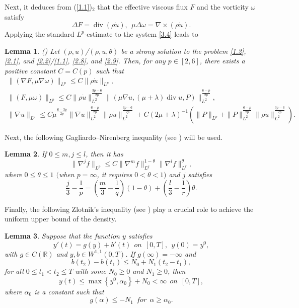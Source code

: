 \documentclass[11pt]{article}
\newtheorem{Lemma}{Lemma}[section]
\DeclareMathOperator{\divv}{div}
\begin{document}
Next, it deduces from (\ref{1.1})$_2$ that the effective viscous flux $F$ and the vorticity $\omega$ satisfy
\begin{equation}\label{3.4}
\Delta F = \divv (\rho \dot u),\ \  \mu \Delta \omega = \nabla \times(\rho \dot u).
\end{equation}
Applying the standard $L^p$-estimate to the system \eqref{3.4} leads to
\begin{Lemma}\label{lem3.3}(\cite{HLX2012})
Let $(\rho, u)$/$(\rho, u, \theta )$ be a strong solution to the problem \eqref{1.2}, \eqref{2.1}, and \eqref{2.2}/\eqref{1.1}, \eqref{2.8}, and \eqref{2.9}. Then, for any $p \in [2,6]$, there exists a positive constant $C=C(p)$ such that
\begin{gather}\label{3.5}
\|(\nabla F,\mu \nabla \omega )\|_{L^p} \leq C \|\rho \dot u\|_{L^p},
\\ \label{3.6}
\|(F, \mu \omega )\|_{L^p} \leq C \|\rho \dot u\|_{L^2}^{\frac{3p - 6}{2p}} \|(\mu \nabla u, (\mu + \lambda ) \divv u, P)\|_{L^2}^{\frac{6 - p}{2p}},
\\ \label{3.7}
\|\nabla u\|_{L^p}
\leq C \mu^{\frac{6 - 3p}{2p}} \|\nabla u\|_{L^2}^{\frac{6 - p}{2p}} \|\rho \dot{u}\|_{L^2}^{\frac{3 p -6}{2p}} + C \left( 2 \mu + \lambda \right)^{-1} \left( \|P\|_{L^p} + \|P\|_{L^2}^{\frac{6 - p}{2p}} \|\rho \dot{u}\|_{L^2}^{\frac{3 p -6}{2p}} \right).
\end{gather}
\end{Lemma}

Next, the following Gagliardo--Nirenberg inequality (see \cite[Theorem 12.87]{book17}) will be used.
\begin{Lemma}\label{lem3.4}
 If $0\leq m,j\leq l$, then it has
$$
\|\nabla^{j}f\|_{L^p} \leq C\|\nabla^m f\|_{L^q}^{1-\theta} \|\nabla^l f\|_{L^r}^\theta,
$$
where $0\leq \theta\leq 1$ $($when $p=\infty$, it requires $0<\theta<1)$   and $j$ satisfies
$$
\frac{j}{3} - \frac{1}{p} = \left( \frac{m}{3} - \frac{1}{q} \right) (1-\theta) + \left(\frac{l}{3} - \frac{1}{r} \right) \theta.
$$
\end{Lemma}


Finally, the following Zlotnik's inequality (see \cite[Lemma 1.3]{Z2000}) play a crucial role to achieve the uniform upper bound of the density.

\begin{Lemma}\label{lem3.5}
Suppose that the function $y$ satisfies
$$
y'(t) = g (y) + b'(t) \ \ on \ \ [0,T], \ \ y(0) = y^0,
$$
with $g \in C (\mathbb{R})$ and $y,b \in W^{1,1} (0,T)$. If $g(\infty ) = - \infty $ and
\begin{equation}\label{3.8}
b (t_2) - b(t_1) \leq N_0 + N_1 (t_2 - t_1),
\end{equation}
for all $0 \leq t_1 < t_2 \leq T$ with some $N_0 \geq 0$ and $N_1 \geq 0$, then $$
y(t) \leq \max \left\{y^0, \alpha_0 \right\} + N_0 < \infty\ \ on \ \ [0,T],
$$
where $\alpha_0$ is a constant such that
\begin{equation}\label{3.9}
g (\alpha) \leq - N_1 \ \ for \ \ \alpha \geq \alpha_0.
\end{equation}
\end{Lemma}
\end{document}
